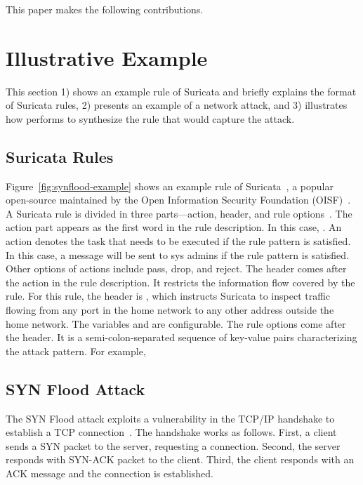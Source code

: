 \documentclass[conference]{IEEEtran}
\begin{document}


This paper makes the following contributions. 

\section{Illustrative Example}
\label{sec:suri-metas-coverage}

This section 1) shows an example rule of Suricata and briefly explains
the format of Suricata rules, 2) presents an example of
a network attack, and 3) illustrates how \tname{} performs to
synthesize the rule that would capture the attack.

\subsection{Suricata Rules}

Figure~\ref{fig:synflood-example} shows an example rule of
Suricata~\cite{suricata}, a popular open-source \nids{} maintained by
the Open Information Security Foundation (OISF)~\cite{oisf}. A
Suricata rule is divided in three
parts---action, header, and rule options~\cite{suri-rule-format}. The
action part appears as the first word in the rule description. In this
case, . An action denotes the task that needs to be
executed if the rule pattern is satisfied. In this case, a message
will be sent to sys admins if the rule pattern is satisfied. Other
options of actions include pass, drop, and reject. The
header comes after the action in the rule description. It restricts
the information flow covered by the rule. For this rule, the header is
, which instructs Suricata
to inspect  traffic flowing from any port in the
home network to any other address outside the home network. The
variables  and  are configurable. The rule
options come after the header. It is a semi-colon-separated sequence
of key-value pairs characterizing the attack pattern. For example,

\subsection{SYN Flood Attack}

The SYN Flood attack exploits a vulnerability in the TCP/IP handshake
to establish a TCP connection~\cite{cloudfare-synflood}. The handshake
works as follows. First, a client sends a SYN packet to the server,
requesting a connection. Second, the server responds with SYN-ACK
packet to the client. Third, the client responds with an ACK message
and the connection is established.
\end{document}
